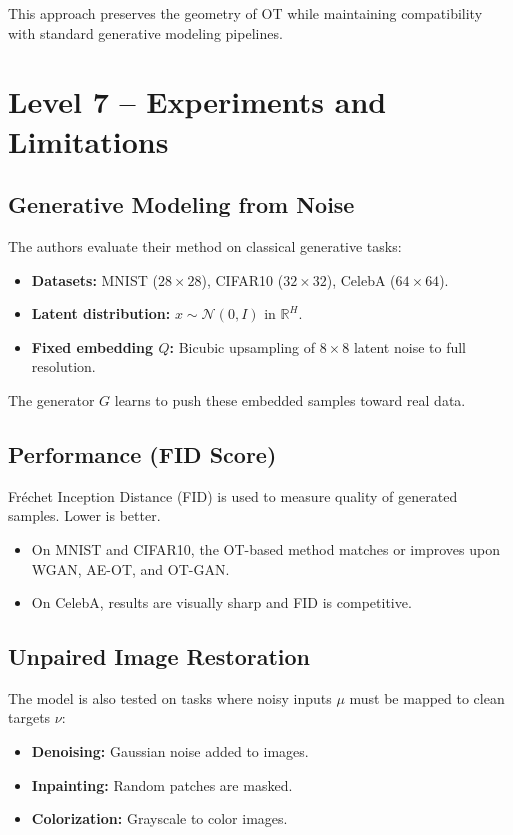 \documentclass[11pt]{article}
\begin{document}
This approach preserves the geometry of OT while maintaining compatibility with standard generative modeling pipelines.

\vspace{1em}

\section*{Level 7 – Experiments and Limitations}

\subsection*{Generative Modeling from Noise}

The authors evaluate their method on classical generative tasks:
\begin{itemize}
  \item \textbf{Datasets:} MNIST ($28\times28$), CIFAR10 ($32\times32$), CelebA ($64\times64$).
  \item \textbf{Latent distribution:} $x \sim \mathcal{N}(0, I)$ in $\mathbb{R}^H$.
  \item \textbf{Fixed embedding $Q$:} Bicubic upsampling of $8\times8$ latent noise to full resolution.
\end{itemize}

The generator $G$ learns to push these embedded samples toward real data.

\subsection*{Performance (FID Score)}

Fréchet Inception Distance (FID) is used to measure quality of generated samples. Lower is better.

\begin{itemize}
  \item On MNIST and CIFAR10, the OT-based method matches or improves upon WGAN, AE-OT, and OT-GAN.
  \item On CelebA, results are visually sharp and FID is competitive.
\end{itemize}

\subsection*{Unpaired Image Restoration}

The model is also tested on tasks where noisy inputs $\mu$ must be mapped to clean targets $\nu$:
\begin{itemize}
  \item \textbf{Denoising:} Gaussian noise added to images.
  \item \textbf{Inpainting:} Random patches are masked.
  \item \textbf{Colorization:} Grayscale to color images.
\end{itemize}
\end{document}
